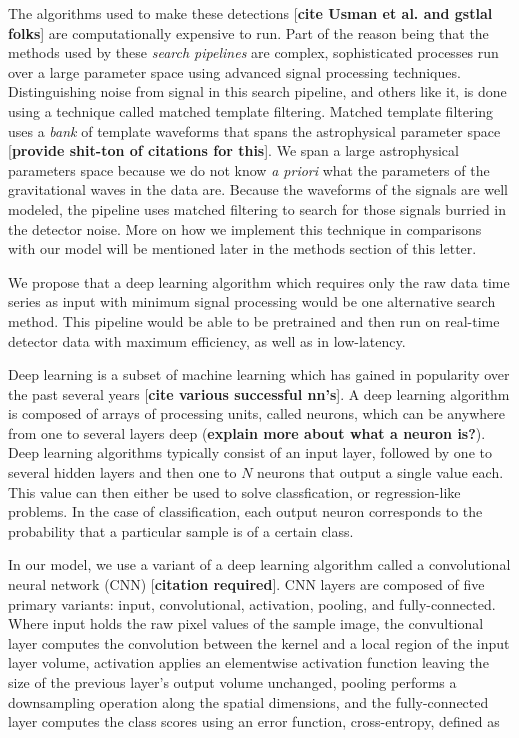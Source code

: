 \documentclass[%
 amsmath,amssymb,
 aps,
 twocolumn,
 prl,
 reprint,
floatfix,
]{revtex4-1}
\begin{document}
The algorithms used to make these detections \cite{0264-9381-33-21-215004} [\textbf{cite Usman et al. and gstlal folks}] are computationally expensive to run. Part of the reason being that the methods used by these \textit{search pipelines} are complex, sophisticated processes run over a large parameter space using advanced signal processing techniques. Distinguishing noise from signal in this search pipeline, and others like it, is done using a technique called matched template filtering. Matched template filtering uses a \textit{bank} of template waveforms that spans the astrophysical parameter space [\textbf{provide shit-ton of citations for this}]. We span a large astrophysical parameters space because we do not know \textit{a priori} what the parameters of the gravitational waves in the data are. Because the waveforms of the signals are well modeled, the pipeline uses matched filtering to search for those signals burried in the detector noise. More on how we implement this technique in comparisons with our model will be mentioned later in the methods section of this letter.

We propose that a deep learning algorithm which requires only the raw data time series as input with minimum signal processing would be one alternative search method. This pipeline would be able to be pretrained and then run on real-time detector data with maximum efficiency, as well as in low-latency.

Deep learning is a subset of machine learning which has gained in popularity over the past several years [\textbf{cite various successful nn's}]. A deep learning algorithm is composed of arrays of processing units, called neurons, which can be anywhere from one to several layers deep (\textbf{explain more about what a neuron is?}). Deep learning algorithms typically consist of an input layer, followed by one to several hidden layers and then one to $N$ neurons that output a single value each. This value can then either be used to solve classfication, or regression-like problems. In the case of classification, each output neuron corresponds to the probability that a particular sample is of a certain class. 

In our model, we use a variant of a deep learning algorithm called a convolutional neural network (CNN) [\textbf{citation required}]. CNN layers are composed of five primary variants: input, convolutional, activation, pooling, and fully-connected. Where input holds the raw pixel values of the sample image, the convultional layer computes the convolution between the kernel and a local region of the input layer volume, activation applies an elementwise activation function leaving the size of the previous layer's output volume unchanged, pooling performs a downsampling operation along the spatial dimensions, and the fully-connected layer computes the class scores using an error function, cross-entropy, defined as
\end{document}
